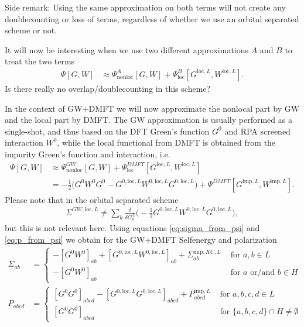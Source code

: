 \documentclass[12pt,a4paper]{scrartcl}
\numberwithin{equation}{section}
\newcommand{\cng}[1]{{\color{red}#1}}
\begin{document}
\bigskip

Side remark: Using the same approximation on both terms will not create any doublecounting or loss
of terms, regardless of whether we use an orbital separated scheme or not.

\bigskip

It will now be interesting when we use two different approximations $A$ and $B$
to treat the two terms
\begin{align}
\Psi[G,W] &\approx \Psi^A_{\mathrm{nonloc}}[G,W] + \Psi^B_{\mathrm{loc}}[G^{\mathrm{loc},L},W^{\mathrm{loc},L}] .
\end{align}
\cng{Is there really no overlap/doublecounting in this scheme?}

\bigskip

In the context of GW+DMFT we will now approximate the nonlocal part by GW and the local part
by DMFT. The GW approximation is usually performed as a single-shot, and thus
based on the DFT Green's function $G^0$ and RPA screened interaction $W^0$,
while the local functional from DMFT is obtained from the impurity Green's function and
interaction, i.e.
\begin{align}
\Psi[G,W] &\approx \Psi^{GW}_{\mathrm{nonloc}}[G,W] + \Psi^{DMFT}_{\mathrm{loc}}[G^{\mathrm{loc},L},W^{\mathrm{loc},L}] \\
&= -\frac{1}{2}\Big( G^0W^0G^0 - G^{0,\mathrm{loc},L}W^{0,\mathrm{loc},L}G^{0,\mathrm{loc},L}  \Big)
                    + \Psi^{DMFT}[G^{\mathrm{imp},L},W^{\mathrm{imp},L}] .
\end{align}
Please note that in the orbital separated scheme 
\begin{align}
 \Sigma^{GW,\mathrm{loc},L} \neq \sum_k \frac{\delta}{\delta G^L_k}
             \Big( -\frac{1}{2} G^{0,\mathrm{loc},L}W^{0,\mathrm{loc},L}G^{0,\mathrm{loc},L} \Big),
\end{align}
but this is not relevant here.
Using equations \eqref{eq:sigma_from_psi} and \eqref{eq:p_from_psi} we obtain for the GW+DMFT
Selfenergy and polarization
\begin{align}
\Sigma_{ab} &= 
\begin{cases}
-[G^0W^0]_{ab} + [G^{0,\mathrm{loc},L}W^{0,\mathrm{loc},L}]_{ab}+ \Sigma_{ab}^{\mathrm{imp},XC,L} & \mbox{ for } a,b \in L  \\
-[G^0W^0]_{ab}                                                                      & \mbox{ for } a \mbox{ or/and } b \in H 
\end{cases}\\
%
%
P_{abcd} &= 
\begin{cases}
[G^0G^0]_{abcd} - [G^{0,\mathrm{loc},L}G^{0,\mathrm{loc},L}]_{abcd}+ P_{abcd}^{\mathrm{imp},L} & \mbox{ for } a,b,c,d \in L  \\
[G^0G^0]_{abcd}                                                                      & \mbox{ for } \{a,b,c,d\} \cap H  \neq \emptyset
\end{cases}
\end{align}
\end{document}
